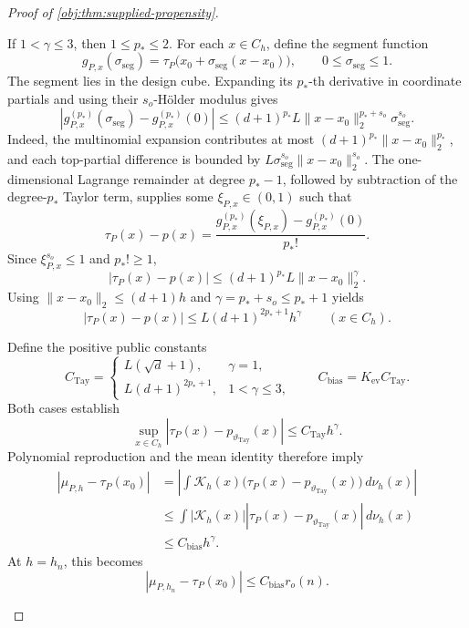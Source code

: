 \begin{proof}[Proof of \cref{obj:thm:supplied-propensity}]
\begin{enumerate}
If \(1<\gamma\le3\), then \(1\le p_*\le2\). For each \(x\in C_h\), define the segment function
\[
g_{P,x}(\sigma_{\mathrm{seg}})=\tau_P\bigl(x_0+\sigma_{\mathrm{seg}}(x-x_0)\bigr),
\qquad 0\le\sigma_{\mathrm{seg}}\le1.
\]
The segment lies in the design cube. Expanding its \(p_*\)-th derivative in coordinate partials and using their \(s_o\)-Hölder modulus gives
\[
\left|g_{P,x}^{(p_*)}(\sigma_{\mathrm{seg}})-g_{P,x}^{(p_*)}(0)\right|
\le
(d+1)^{p_*}L
\|x-x_0\|_2^{p_*+s_o}\sigma_{\mathrm{seg}}^{s_o}.
\]
Indeed, the multinomial expansion contributes at most
\((d+1)^{p_*}\|x-x_0\|_2^{p_*}\), and each top-partial difference is bounded by
\(L\sigma_{\mathrm{seg}}^{s_o}\|x-x_0\|_2^{s_o}\).
The one-dimensional Lagrange remainder at degree \(p_*-1\), followed by subtraction of the degree-\(p_*\) Taylor term, supplies some
\(\xi_{P,x}\in(0,1)\) such that
\[
\tau_P(x)-p(x)
=
\frac{
g_{P,x}^{(p_*)}(\xi_{P,x})
-g_{P,x}^{(p_*)}(0)
}{p_*!}.
\]
Since \(\xi_{P,x}^{s_o}\le1\) and \(p_*!\ge1\),
\[
|\tau_P(x)-p(x)|
\le(d+1)^{p_*}L\|x-x_0\|_2^\gamma.
\]
Using \(\|x-x_0\|_2\le(d+1)h\) and
\(\gamma=p_*+s_o\le p_*+1\) yields
\[
|\tau_P(x)-p(x)|
\le L(d+1)^{2p_*+1}h^\gamma
\qquad(x\in C_h).
\]

Define the positive public constants
\[
C_{\mathrm{Tay}}=
\begin{cases}
L(\sqrt d+1),&\gamma=1,\\
L(d+1)^{2p_*+1},&1<\gamma\le3,
\end{cases}
\qquad
C_{\mathrm{bias}}=K_{\mathrm{ev}}C_{\mathrm{Tay}}.
\]
Both cases establish
\[
\sup_{x\in C_h}|\tau_P(x)-p_{\vartheta_{\mathrm{Tay}}}(x)|
\le C_{\mathrm{Tay}}h^\gamma.
\]
Polynomial reproduction and the mean identity therefore imply
\[
\begin{aligned}
|\mu_{P,h}-\tau_P(x_0)|
&=
\left|
\int\mathcal K_h(x)
\bigl(\tau_P(x)-p_{\vartheta_{\mathrm{Tay}}}(x)\bigr)
\,d\nu_h(x)
\right|\\
&\le
\int|\mathcal K_h(x)|
\left|\tau_P(x)-p_{\vartheta_{\mathrm{Tay}}}(x)\right|
\,d\nu_h(x)\\
&\le C_{\mathrm{bias}}h^\gamma.
\end{aligned}
\]
At \(h=h_n\), this becomes
\[
|\mu_{P,h_n}-\tau_P(x_0)|
\le C_{\mathrm{bias}}r_o(n).
\]


\end{enumerate}
\end{proof}
